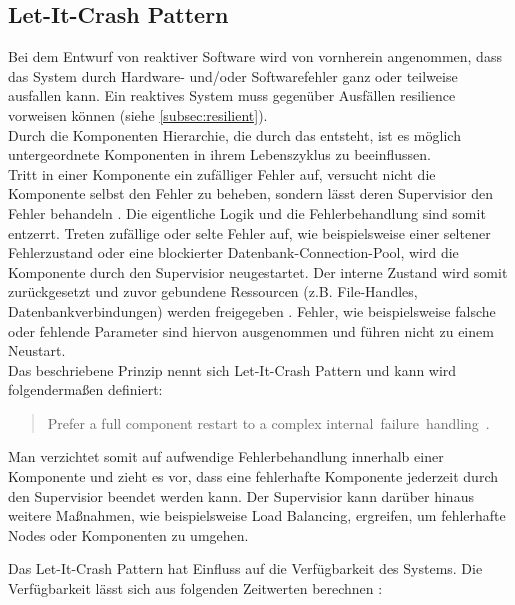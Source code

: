 \pagebreak

\subsection{Let-It-Crash Pattern}\label{subsec:let-it-crash-pattern}
Bei dem Entwurf von reaktiver Software wird von vornherein angenommen, dass das System durch Hardware- und/oder Softwarefehler ganz oder teilweise ausfallen kann. Ein reaktives System muss gegenüber Ausfällen resilience vorweisen können (siehe \ref{subsec:resilient}).\\
Durch die Komponenten Hierarchie, die durch das  entsteht, ist es möglich untergeordnete Komponenten in ihrem Lebenszyklus zu beeinflussen.\\
Tritt in einer Komponente ein zufälliger Fehler auf, versucht nicht die Komponente selbst den Fehler zu beheben, sondern lässt deren Supervisior den Fehler behandeln \cite[S.~196]{kuhn_reactive_2015} \cite[S.~200~\&~S.~201]{armstrong_programming_2013}. Die eigentliche Logik und die Fehlerbehandlung sind somit entzerrt. Treten zufällige oder selte Fehler auf, wie beispielsweise einer seltener Fehlerzustand oder eine blockierter Datenbank-Connection-Pool, wird die Komponente durch den Supervisior neugestartet. Der interne Zustand wird somit zurückgesetzt und zuvor gebundene Ressourcen (z.B. File-Handles, Datenbankverbindungen) werden freigegeben \cite[S.~197]{kuhn_reactive_2015}. Fehler, wie beispielsweise falsche oder fehlende Parameter sind hiervon ausgenommen und führen nicht zu einem Neustart.\\
Das beschriebene Prinzip nennt sich Let-It-Crash Pattern und kann wird folgendermaßen definiert:

\begin{quotation}
Prefer a full component restart to a complex internal~failure~handling~\cite[S.~196]{kuhn_reactive_2015}.
\end{quotation}

Man verzichtet somit auf aufwendige Fehlerbehandlung innerhalb einer Komponente und zieht es vor, dass eine fehlerhafte Komponente jederzeit durch den Supervisior beendet werden kann. Der Supervisior kann darüber hinaus weitere Maßnahmen, wie beispielsweise Load Balancing, ergreifen, um fehlerhafte Nodes oder Komponenten zu umgehen.

\pagebreak

Das Let-It-Crash Pattern hat Einfluss auf die Verfügbarkeit des Systems. Die Verfügbarkeit lässt sich aus folgenden Zeitwerten berechnen \cite{friedrichsen_unkaputtbar_2014}:

